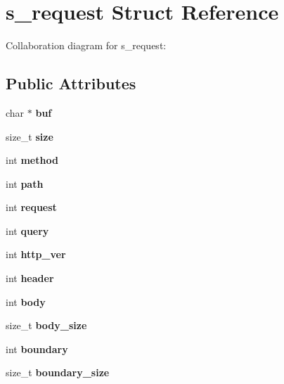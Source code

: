 \hypertarget{structs__request}{}\section{s\+\_\+request Struct Reference}
\label{structs__request}


Collaboration diagram for s\+\_\+request\+:
\subsection*{Public Attributes}
\begin{DoxyCompactItemize}
\item 
\mbox{\label{structs__request_aac69436b6e84ea94c3666658bfd0e328}} 
char $\ast$ {\bfseries buf}
\item 
\mbox{\label{structs__request_a1f5b85a44c7f0a8dd3ca1e59d6f31932}} 
size\+\_\+t {\bfseries size}
\item 
\mbox{\label{structs__request_a8743a246ebf8f0b49b4ebe6e4db637f7}} 
int {\bfseries method}
\item 
\mbox{\label{structs__request_a8736ed96e2e0188919a6871692ba35e0}} 
int {\bfseries path}
\item 
\mbox{\label{structs__request_a6c5a0fdb6ef8e47c6b7fb3d194883a63}} 
int {\bfseries request}
\item 
\mbox{\label{structs__request_a8194e309c765142e46fa9d4fd97fd3e7}} 
int {\bfseries query}
\item 
\mbox{\label{structs__request_a09db2b178a2136f908350c6c0b14438c}} 
int {\bfseries http\+\_\+ver}
\item 
\mbox{\label{structs__request_a2f012205664ee1dd25770a27a744a710}} 
int {\bfseries header}
\item 
\mbox{\label{structs__request_a4dd40502f88a62480b2f3379d3bd00bd}} 
int {\bfseries body}
\item 
\mbox{\label{structs__request_af8e57ebd0e1afed7ea8f3c3d38eee20f}} 
size\+\_\+t {\bfseries body\+\_\+size}
\item 
\mbox{\label{structs__request_a6394ce236dd1584d53968fb7cee7ddc7}} 
int {\bfseries boundary}
\item 
\mbox{\label{structs__request_aa2517488d32ad4b03a439f5d8dbe3fde}} 
size\+\_\+t {\bfseries boundary\+\_\+size}
\end{DoxyCompactItemize}


